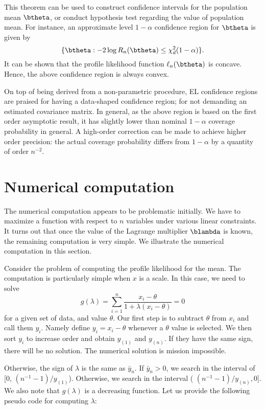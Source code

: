 \vs
This theorem can be used to construct confidence intervals for the population mean $\btheta$,
or conduct hypothesis test regarding the value of population mean. For instance, an
approximate level $1-\alpha$ confidence region for $\btheta$ is given by
\[
\{\btheta:  -2 \log R_n(\btheta) \leq \chi_d^2(1-\alpha) \}.
\]
It can be shown that the profile likelihood function $\ell_n(\btheta)$ is
concave. Hence, the above confidence region is always convex.

On top of being derived from a non-parametric procedure, 
EL confidence regions are praised for
having a data-shaped confidence region; for not demanding an estimated
covariance matrix. In general, as the above region is based on the first order asymptotic result,
it has slightly lower than nominal $1-\alpha$ coverage probability in general.
A high-order correction can be made to achieve higher order precision: the
actual coverage probability differs from $1-\alpha$ by a quantity of order $n^{-2}$.
 

\section{Numerical computation}

The numerical computation appears to be problematic initially. 
We have to maximize a function with respect to $n$ variables under various linear constraints. 
It turns out that once the value of the Lagrange multiplier $\blambda$ 
is known, the remaining computation is very simple.
We illustrate the numerical computation in this section.

Consider the problem of computing the profile likelihood for the mean. 
The computation is particularly simple when $x$ is a scale. In this case, we need to solve
\[
g(\lambda ) = \sum_{i=1}^n \frac{x_i - \theta}{1 + \lambda (x_i - \theta)} = 0
\]
for a given set of data, and value $\theta$.
Our first step is to subtract $\theta$ from $x_i$ and call them $y_i$.
Namely define $y_i = x_i - \theta$ whenever a $\theta$ value is selected.
We then sort $y_i$ to increase order and obtain $y_{(1)}$ and $y_{(n)}$.
If they have the same sign, there will be no solution. The numerical
solution is mission impossible.

Otherwise, the sign of $\lambda$ is the same as $\bar y_n$. If $\bar y_n > 0$,
we search in the interval of [0, $(n^{-1} - 1)/y_{(1)}$). Otherwise, we search in the
interval ( $(n^{-1} - 1)/y_{(n)}, 0$].
We also note that $g(\lambda)$ is a decreasing function. Let us
provide the following pseudo code for computing $\lambda$:

